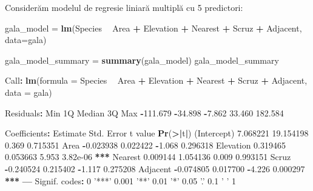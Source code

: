 \documentclass[]{article}
\newenvironment{Shaded}{\begin{snugshade}}{\end{snugshade}}
\newcommand{\KeywordTok}[1]{\textcolor[rgb]{0.13,0.29,0.53}{\textbf{#1}}}
\newcommand{\DataTypeTok}[1]{\textcolor[rgb]{0.13,0.29,0.53}{#1}}
\newcommand{\DecValTok}[1]{\textcolor[rgb]{0.00,0.00,0.81}{#1}}
\newcommand{\FloatTok}[1]{\textcolor[rgb]{0.00,0.00,0.81}{#1}}
\newcommand{\StringTok}[1]{\textcolor[rgb]{0.31,0.60,0.02}{#1}}
\newcommand{\OperatorTok}[1]{\textcolor[rgb]{0.81,0.36,0.00}{\textbf{#1}}}
\newcommand{\ErrorTok}[1]{\textcolor[rgb]{0.64,0.00,0.00}{\textbf{#1}}}
\newcommand{\NormalTok}[1]{#1}
\begin{document}
Considerăm modelul de regresie liniară multiplă cu 5 predictori:

\begin{Shaded}
\begin{Highlighting}[]
\NormalTok{gala_model =}\StringTok{ }\KeywordTok{lm}\NormalTok{(Species }\OperatorTok{~}\StringTok{ }\NormalTok{Area }\OperatorTok{+}\StringTok{ }\NormalTok{Elevation }\OperatorTok{+}\StringTok{ }\NormalTok{Nearest }\OperatorTok{+}\StringTok{ }\NormalTok{Scruz }\OperatorTok{+}\StringTok{ }\NormalTok{Adjacent, }\DataTypeTok{data=}\NormalTok{gala)}

\NormalTok{gala_model_summary =}\StringTok{ }\KeywordTok{summary}\NormalTok{(gala_model)}
\NormalTok{gala_model_summary}

\NormalTok{Call}\OperatorTok{:}
\KeywordTok{lm}\NormalTok{(}\DataTypeTok{formula =}\NormalTok{ Species }\OperatorTok{~}\StringTok{ }\NormalTok{Area }\OperatorTok{+}\StringTok{ }\NormalTok{Elevation }\OperatorTok{+}\StringTok{ }\NormalTok{Nearest }\OperatorTok{+}\StringTok{ }\NormalTok{Scruz }\OperatorTok{+}\StringTok{ }\NormalTok{Adjacent, }
    \DataTypeTok{data =}\NormalTok{ gala)}

\NormalTok{Residuals}\OperatorTok{:}
\StringTok{     }\NormalTok{Min       1Q   Median       3Q      Max }
\OperatorTok{-}\FloatTok{111.679}  \OperatorTok{-}\FloatTok{34.898}   \OperatorTok{-}\FloatTok{7.862}   \FloatTok{33.460}  \FloatTok{182.584} 

\NormalTok{Coefficients}\OperatorTok{:}
\StringTok{             }\NormalTok{Estimate Std. Error t value }\KeywordTok{Pr}\NormalTok{(}\OperatorTok{>}\ErrorTok{|}\NormalTok{t}\OperatorTok{|}\NormalTok{)    }
\NormalTok{(Intercept)  }\FloatTok{7.068221}  \FloatTok{19.154198}   \FloatTok{0.369} \FloatTok{0.715351}    
\NormalTok{Area        }\OperatorTok{-}\FloatTok{0.023938}   \FloatTok{0.022422}  \OperatorTok{-}\FloatTok{1.068} \FloatTok{0.296318}    
\NormalTok{Elevation    }\FloatTok{0.319465}   \FloatTok{0.053663}   \FloatTok{5.953} \FloatTok{3.82e-06} \OperatorTok{**}\ErrorTok{*}
\NormalTok{Nearest      }\FloatTok{0.009144}   \FloatTok{1.054136}   \FloatTok{0.009} \FloatTok{0.993151}    
\NormalTok{Scruz       }\OperatorTok{-}\FloatTok{0.240524}   \FloatTok{0.215402}  \OperatorTok{-}\FloatTok{1.117} \FloatTok{0.275208}    
\NormalTok{Adjacent    }\OperatorTok{-}\FloatTok{0.074805}   \FloatTok{0.017700}  \OperatorTok{-}\FloatTok{4.226} \FloatTok{0.000297} \OperatorTok{**}\ErrorTok{*}
\OperatorTok{---}
\NormalTok{Signif. codes}\OperatorTok{:}\StringTok{  }\DecValTok{0} \StringTok{'***'} \FloatTok{0.001} \StringTok{'**'} \FloatTok{0.01} \StringTok{'*'} \FloatTok{0.05} \StringTok{'.'} \FloatTok{0.1} \StringTok{' '} \DecValTok{1}


\end{Highlighting}
\end{Shaded}
\end{document}
